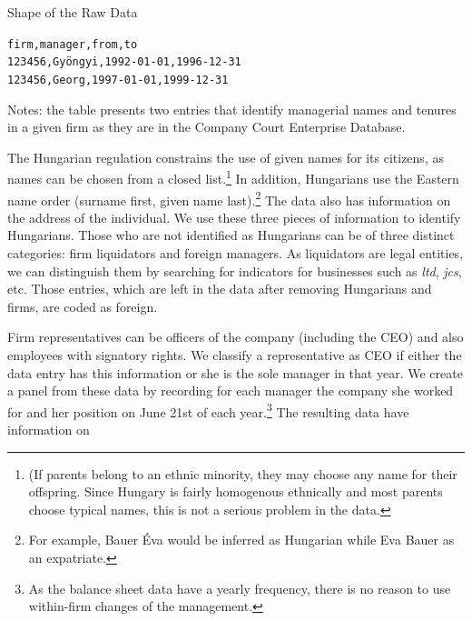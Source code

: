 \documentclass[12pt,a4paper]{article}
\begin{document}
\begin{table}[h!]
\caption{Shape of the Raw Data}
\label{table:rawdata}
\centering
\texttt{firm,manager,from,to\\
123456,Gyöngyi,1992-01-01,1996-12-31\\
123456,Georg,1997-01-01,1999-12-31}
\begin{tablenotes}
			\small
      \item {Notes: the table presents two entries that identify managerial names and tenures in a given firm as they are in the Company Court Enterprise Database}.
    \end{tablenotes}
\end{table}

The Hungarian regulation constrains the use of given names for its citizens, as names can be chosen from a closed list.\footnote{(If parents belong to an ethnic minority, they may choose any name for their offspring. Since Hungary is fairly homogenous ethnically and most parents choose typical names, this is not a serious problem in the data.}  In addition, Hungarians use the Eastern name order (surname first, given name last).\footnote{For example, Bauer Éva would be inferred as Hungarian while Eva Bauer as an expatriate.} The data also has  information on the address of the individual. We use these three pieces of information to identify Hungarians. Those who are not identified as Hungarians can be of three distinct categories: firm liquidators and foreign managers.  As liquidators are legal entities, we can distinguish them by searching for indicators for businesses such as \emph{ltd}, \emph{jcs}, etc. Those entries, which are left in the data after removing Hungarians and firms, are coded as foreign.

Firm representatives can be officers of the company (including the CEO) and also employees with signatory rights.  We classify a representative as CEO if either the data entry has this information or she is the sole manager in that year. We create a panel from these data by recording for each manager the company she worked for and her position on June 21st of each year.\footnote{As the balance sheet data have a yearly frequency, there is no reason to use within-firm changes of the management.} The resulting data have information on %
\end{document}
